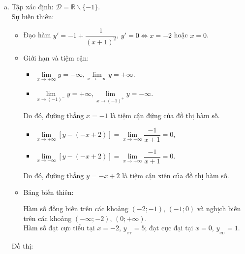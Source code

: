 \begin{vd}
{\begin{enumerate}[a)]
	\item Tập xác định: $\mathscr{D}=\mathbb{R} \backslash\{-1\}$.\\
	Sự biến thiên:
	\begin{itemize}
		\item [$\bullet$] Đạo hàm $y'=-1+\dfrac{1}{(x+1)^2}$, $y'=0\Leftrightarrow x=-2$ hoặc $x=0$.
		\item [$\bullet$] Giới hạn và tiệm cận:\\
		\begin{itemize}
			\item $\lim\limits_{x \rightarrow +\infty} y= -\infty, \lim\limits_{x \rightarrow -\infty} y= +\infty$.
			\item $\lim\limits_{x \rightarrow (-1)^{-}} y= +\infty, \lim\limits_{x \rightarrow (-1)^{+}} y= -\infty$.
		\end{itemize}
		Do đó, đường thẳng $x=-1$ là tiệm cận đứng của đồ thị hàm số.
		\begin{itemize}
			\item $\lim\limits_{x \rightarrow+\infty}[y - (-x+2)]=\lim\limits_{x \rightarrow +\infty} \dfrac{-1}{x+1}=0$,
			\item $ \lim\limits_{x \rightarrow-\infty}[y - (-x+2)]=\lim\limits_{x \rightarrow +\infty} \dfrac{-1}{x+1}=0$.
		\end{itemize}
		Do đó, đường thẳng $y= -x+2 $ là tiệm cận xiên của đồ thị hàm số.
		\item [$\bullet$] Bảng biến thiên:
		\begin{center}
		\end{center}
		Hàm số đồng biến trên các khoảng $(-2;-1)$, $(-1;0)$ và nghịch biến trên các khoảng $(-\infty;-2)$, $(0;+\infty)$.\\
		Hàm số đạt cực tiểu tại $x=-2$, $y_{_\text{CT}}=5$; đạt cực đại tại $x=0$, $y_{_\text{CĐ}}=1$.\\
	\end{itemize}
	Đồ thị:\\
	\immini[thm]{
		\begin{itemize}

\end{itemize}}
\end{enumerate}}
\end{vd}
